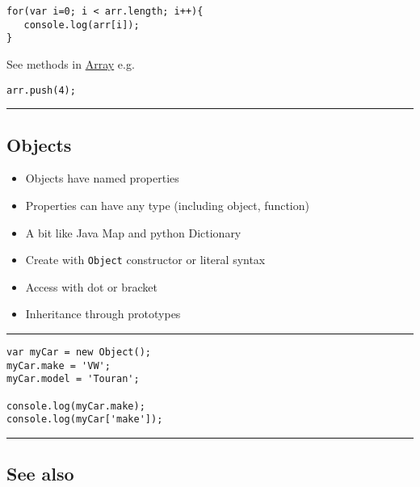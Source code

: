 \begin{verbatim}
for(var i=0; i < arr.length; i++){
   console.log(arr[i]);
}
\end{verbatim}

See methods in
\href{https://developer.mozilla.org/en-US/docs/Web/JavaScript/Reference/Global_Objects/Array}{Array}
e.g.

\begin{verbatim}
arr.push(4);
\end{verbatim}

\begin{center}\rule{0.5\linewidth}{\linethickness}\end{center}

\hypertarget{objects}{%
\subsection{Objects}\label{objects}}

\begin{itemize}
\tightlist
\item
  Objects have named properties
\item
  Properties can have any type (including object, function)
\item
  A bit like Java Map and python Dictionary
\item
  Create with \texttt{Object} constructor or literal syntax
\item
  Access with dot or bracket
\item
  Inheritance through prototypes
\end{itemize}

\begin{center}\rule{0.5\linewidth}{\linethickness}\end{center}

\begin{verbatim}
var myCar = new Object();
myCar.make = 'VW';
myCar.model = 'Touran';

console.log(myCar.make);
console.log(myCar['make']);
\end{verbatim}

\begin{center}\rule{0.5\linewidth}{\linethickness}\end{center}

\hypertarget{see-also}{%
\subsection{See also}\label{see-also}}

